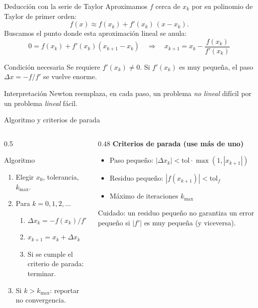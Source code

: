 \documentclass[aspectratio=169,11pt]{beamer}
\begin{document}
\begin{frame}{Deducción con la serie de Taylor}
  Aproximamos $f$ cerca de $x_k$ por su polinomio de Taylor de primer orden:
  \[
    f(x)\approx f(x_k)+f'(x_k)\,(x-x_k).
  \]
  Buscamos el punto donde esta aproximación lineal se anula:
  \[
    0=f(x_k)+f'(x_k)(x_{k+1}-x_k)
    \quad\Longrightarrow\quad
    \boxed{x_{k+1}=x_k-\frac{f(x_k)}{f'(x_k)}}
  \]
  \begin{alertblock}{Condición necesaria}
    Se requiere $f'(x_k)\neq 0$. Si $f'(x_k)$ es muy pequeña, el paso $\Delta x=-f/f'$ se vuelve enorme.
  \end{alertblock}
  \begin{block}{Interpretación}
    Newton reemplaza, en cada paso, un problema \emph{no lineal} difícil por un problema \emph{lineal} fácil.
  \end{block}
\end{frame}

\begin{frame}{Algoritmo y criterios de parada}
  \begin{columns}[T]
    \begin{column}{0.5\textwidth}
      \begin{block}{Algoritmo}
        \begin{enumerate}
          \item Elegir $x_0$, tolerancia, $k_{\max}$.
          \item Para $k=0,1,2,\dots$
          \begin{enumerate}
            \item $\Delta x_k=-f(x_k)/f'(x_k)$
            \item $x_{k+1}=x_k+\Delta x_k$
            \item Si se cumple el criterio de parada: terminar.
          \end{enumerate}
          \item Si $k>k_{\max}$: reportar \alert{no convergencia}.
        \end{enumerate}
      \end{block}
    \end{column}
    \begin{column}{0.48\textwidth}
      \textbf{Criterios de parada (use más de uno)}
      \begin{itemize}
        \item Paso pequeño: $|\Delta x_k|<\text{tol}\cdot\max(1,|x_{k+1}|)$
        \item Residuo pequeño: $|f(x_{k+1})|<\text{tol}_f$
        \item Máximo de iteraciones $k_{\max}$
      \end{itemize}
      \medskip
      \alert{Cuidado:} un residuo pequeño no garantiza un error pequeño si $|f'|$ es muy pequeña (y viceversa).
    \end{column}
  \end{columns}
\end{frame}
\end{document}
